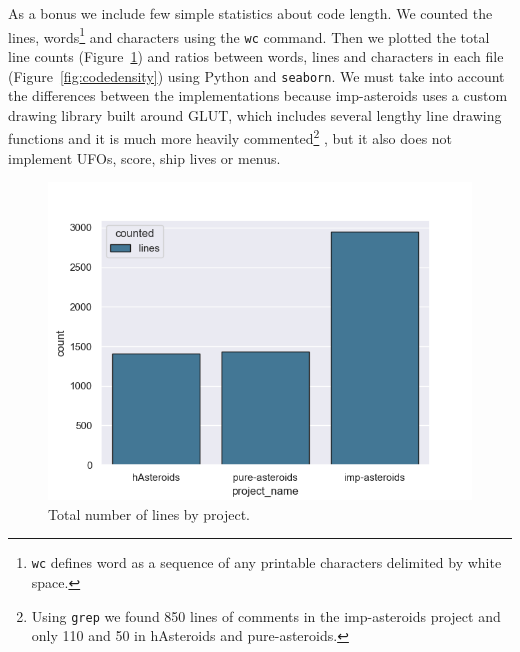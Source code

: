 \documentclass[
  digital, %
  color,   %
  table,   %
  oneside, %
  lof,     %
  lot,     %
]{fithesis3}
\newcommand{\packagename}{\texttt}
\begin{document}
{As a bonus we include few simple statistics about code length.
We counted the lines, words\footnote{
\texttt{wc} defines word
as a sequence of any printable characters delimited by white space.
}
and characters using the \texttt{wc} command.
Then we plotted the total line counts (Figure~\ref{fig:codelength}) and
ratios between words, lines and characters in each file (Figure~\ref{fig:codedensity})
using Python and \packagename{seaborn}. We must take into account the differences between
the implementations because imp-asteroids uses a custom drawing library
built around GLUT, which includes several lengthy line drawing functions and
it is much more heavily commented\footnote{
Using \texttt{grep} we found 850 lines of comments in the imp-asteroids project
and only 110 and 50 in hAsteroids and pure-asteroids.
}
, but it also does not implement UFOs, score, ship lives or menus.

\begin{figure}
    \centering
    \includegraphics[width=\textwidth]{images/total_lines_by_project.png}
    \caption{Total number of lines by project.}
    \label{fig:codelength}
\end{figure}

}
\end{document}

